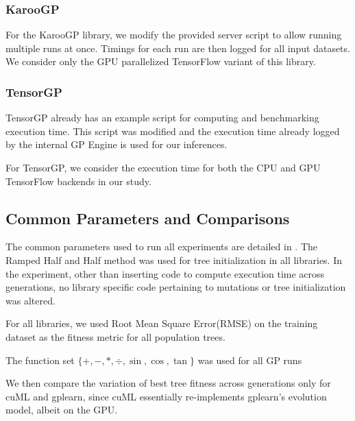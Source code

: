 \subsubsection{KarooGP}
For the KarooGP library, we modify the provided server script to allow running multiple runs at once. Timings for each run are then logged for all input datasets. We consider only the GPU parallelized TensorFlow variant of this library.

\subsubsection{TensorGP}
TensorGP already has an example script for computing and benchmarking execution time. This script was modified and the execution time already logged by the internal GP Engine is used for our inferences.

For TensorGP, we consider the execution time for both the CPU and GPU TensorFlow backends in our study.

\subsection{Common Parameters and Comparisons}
\label{subsec:commparams}
 
The common parameters used to run all experiments are detailed in . The Ramped Half and Half method was used for tree initialization in all libraries. In the experiment, other than inserting code to compute execution time across generations, no library specific code pertaining to mutations or tree initialization was altered.

For all libraries, we used Root Mean Square Error(RMSE) on the training dataset as the fitness metric for all population trees. 

The function set $\{+,-,*,\div,\sin ,\cos,\tan\}$ was used for all GP runs 

We then compare the variation of best tree fitness across generations only for cuML and gplearn, since cuML essentially re-implements gplearn's evolution model, albeit on the GPU. 

